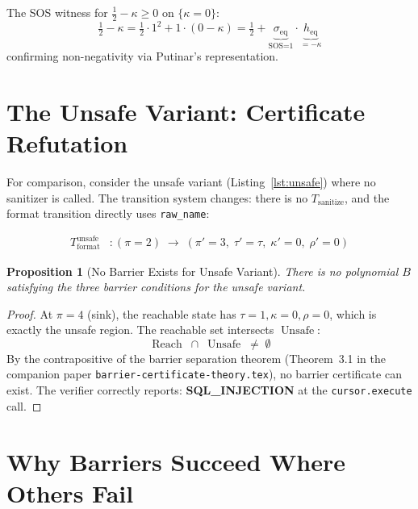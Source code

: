 \documentclass[11pt,a4paper]{article}
\theoremstyle{plain}
\newtheorem{proposition}[theorem]{Proposition}
\theoremstyle{definition}
\theoremstyle{remark}
\newcommand{\Reach}{\operatorname{Reach}}
\newcommand{\Unsafe}{\operatorname{Unsafe}}
\begin{document}
The SOS witness for $\tfrac{1}{2} - \kappa \geq 0$ on $\{\kappa = 0\}$:
\begin{equation}
  \tfrac{1}{2} - \kappa
    = \tfrac{1}{2} \cdot 1^2 + 1 \cdot (0 - \kappa)
    = \tfrac{1}{2} + \underbrace{\sigma_{\text{eq}}}_{\text{SOS=1}} \cdot
      \underbrace{h_{\text{eq}}}_{=-\kappa}
\end{equation}
confirming non-negativity via Putinar's representation.

\section{The Unsafe Variant: Certificate Refutation}
\label{sec:unsafe}

For comparison, consider the unsafe variant
(Listing~\ref{lst:unsafe}) where no sanitizer is called.  The
transition system changes: there is no $T_{\text{sanitize}}$, and
the format transition directly uses \texttt{raw\_name}:

\begin{align}
  T_{\text{format}}^{\text{unsafe}} &: (\pi=2) \;\longrightarrow\;
    (\pi'=3,\; \tau'=\tau,\; \kappa'=0,\; \rho'=0)
\end{align}

\begin{proposition}[No Barrier Exists for Unsafe Variant]
There is no polynomial $B$ satisfying the three barrier conditions for
the unsafe variant.
\end{proposition}

\begin{proof}
At $\pi=4$ (sink), the reachable state has $\tau=1, \kappa=0, \rho=0$,
which is exactly the unsafe region.  The reachable set intersects
$\Unsafe$:
\[
  \Reach \;\cap\; \Unsafe \;\neq\; \emptyset
\]
By the contrapositive of the barrier separation theorem
(Theorem~3.1 in the companion paper
\texttt{barrier-certificate-theory.tex}), no barrier certificate can
exist.  The verifier correctly reports: \textbf{SQL\_INJECTION}
at the \texttt{cursor.execute} call.
\end{proof}

\section{Why Barriers Succeed Where Others Fail}
\label{sec:comparison}
\end{document}
